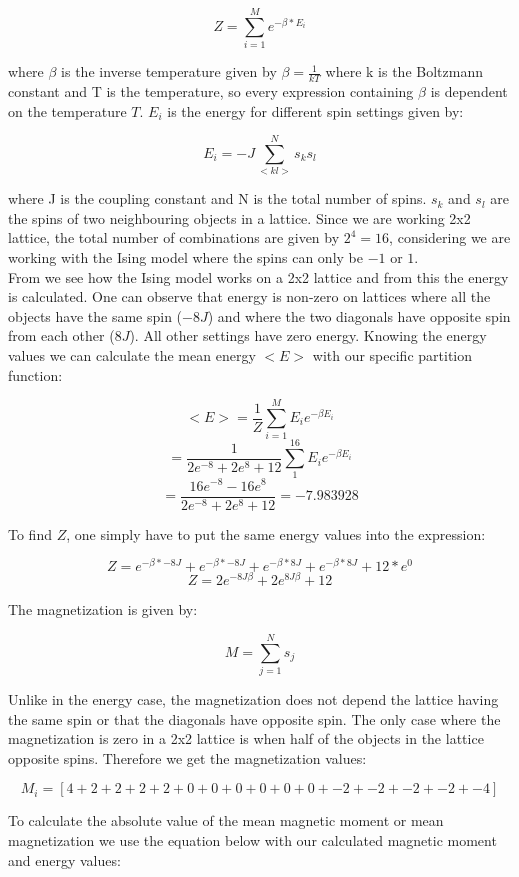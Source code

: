 \documentclass[10pt,a4paper]{article}
\begin{document}
$$
Z = \sum^{M}_{i = 1} e^{-\beta * E_i}
$$ 

\noindent where $\beta$ is the inverse temperature given by $\beta = \frac{1}{kT}$ where k is the Boltzmann constant and T is the temperature, so every expression containing $\beta$ is dependent on the temperature $T$. $E_i$ is the energy for different spin settings given by:

$$
E_i = -J\sum^{N}_{<kl>} s_ks_l
$$

\noindent where J is the coupling constant and N is the total number of spins. $s_k$ and $s_l$ are the spins of two neighbouring objects in a lattice. Since we are working 2x2 lattice, the total number of combinations are given by $2^4 = 16$, considering we are working with the Ising model where the spins can only be $-1$ or $1$.\\

\noindent From  we see how the Ising model works on a 2x2 lattice and from this the energy is calculated. One can observe that energy is non-zero on lattices where all the objects have the same spin ($-8J$) and where the two diagonals have opposite spin from each other ($8J$). All other settings have zero energy. Knowing the energy values we can calculate the mean energy $<E>$ with our specific partition function:

$$
<E> = \frac{1}{Z}\sum^{M}_{i = 1} E_i e^{-\beta E_i}
$$
$$
 = \frac{1}{2e^{-8} + 2e^{8} + 12}\sum^{16}_{1} E_i e^{-\beta E_i}
$$
$$
 = \frac{16e^{-8}-16e^{8}}{2e^{-8} + 2e^{8} + 12} = -7.983928
$$

\noindent To find $Z$, one simply have to put the same energy values into the expression:

$$
Z = e^{-\beta * -8J} + e^{-\beta * -8J} + e^{-\beta * 8J} + e^{-\beta * 8J} + 12*e^0
$$
$$
Z = 2e^{-8J\beta} + 2e^{8J\beta} + 12
$$

\noindent The magnetization is given by:

$$
M = \sum^{N}_{j = 1} s_j
$$

\noindent Unlike in the energy case, the magnetization does not depend the lattice having the same spin or that the diagonals have opposite spin. The only case where the magnetization is zero in a 2x2 lattice is when half of the objects in the lattice opposite spins. Therefore we get the magnetization values:

$$
M_i = [4 + 2 + 2 + 2 + 2 + 0 + 0 + 0 + 0 + 0 + 0 + -2 + -2 + -2 + -2 + -4]
$$

\noindent To calculate the absolute value of the mean magnetic moment or mean magnetization we use the equation below with our calculated magnetic moment and energy values:
\end{document}

